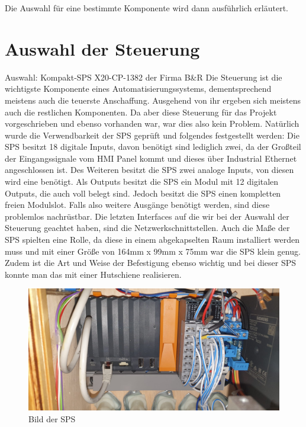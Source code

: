 \documentclass[10pt,a4paper]{report}
\begin{document}
	Die Auswahl für eine bestimmte Komponente wird dann ausführlich erläutert.
	
	\section{Auswahl der Steuerung}
	
	Auswahl: Kompakt-SPS X20-CP-1382 der Firma B\&R
	Die Steuerung ist die wichtigste Komponente eines Automatisierungssystems, dementsprechend meistens auch die teuerste Anschaffung. Ausgehend von ihr ergeben sich meistens auch die restlichen Komponenten. Da aber diese Steuerung für das Projekt vorgeschrieben und ebenso vorhanden war, war dies also kein Problem.	
	Natürlich wurde die Verwendbarkeit der SPS geprüft und folgendes festgestellt werden:
	Die SPS besitzt 18 digitale Inputs, davon benötigt sind lediglich zwei, da der Großteil der Eingangssignale vom HMI Panel kommt und dieses über Industrial Ethernet angeschlossen ist. Des Weiteren besitzt die SPS zwei analoge Inputs, von diesen wird eine benötigt. Als Outputs besitzt die SPS ein Modul mit 12 digitalen Outputs, die auch voll belegt sind. Jedoch besitzt die SPS einen kompletten freien Modulslot. Falls also weitere Ausgänge benötigt werden, sind diese problemlos nachrüstbar. Die letzten Interfaces auf die wir bei der Auswahl der Steuerung geachtet haben, sind die Netzwerkschnittstellen. 	
	Auch die Maße der SPS spielten eine Rolle, da diese in einem abgekapselten Raum installiert werden muss und mit einer Größe von 164mm x 99mm x 75mm war die SPS klein genug.	
	Zudem ist die Art und Weise der Befestigung ebenso wichtig und bei dieser SPS konnte man das mit einer Hutschiene realisieren.\\ 
	\begin{figure}[htb]
		\includegraphics[width=1\textwidth]{IMG-20230913-WA0000}
		\centering
		\caption{Bild der SPS}
	\end{figure}
	\newpage
	
\end{document}
